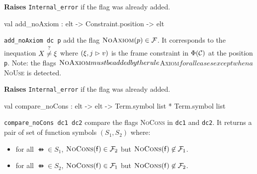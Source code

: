 \begin{ocamldocsigend}
\begin{ocamldocdescription}
{\bf Raises} {\tt{Internal\_error}} if the flag was already added. \lowdebug 


\end{ocamldocdescription}


\label{val:Constraint.Deducibility.add-underscorenoAxiom}\begin{ocamldoccode}
val add_noAxiom : elt ->
  Constraint.position -> elt
\end{ocamldoccode}
\begin{ocamldocdescription}
{\tt{add\_noAxiom dc p}} add the flag $\textsc{NoAxiom}(p) \in \mathcal{F}$. 
      It corresponds to the inequation $X \stackrel{?}{\neq} \xi$ where $(\xi, j \vartriangleright v)$ is the 
      frame constraint in $\Phi(\mathcal{C})$ at the position  {\tt{p}}.
      Note: the flags $\textsc{NoAxiom}  must be added by the rule $\textsc{Axiom}$  for all 
      cases except when a $\textsc{NoUse}  is detected.

{\bf Raises} {\tt{Internal\_error}} if the flag was already added. \lowdebug 


\end{ocamldocdescription}


\label{val:Constraint.Deducibility.compare-underscorenoCons}\begin{ocamldoccode}
val compare_noCons : elt ->
  elt -> Term.symbol list * Term.symbol list
\end{ocamldoccode}
\begin{ocamldocdescription}
{\tt{compare\_noCons dc1 dc2}} compare the flags \textsc{NoCons}  in {\tt{dc1}} and {\tt{dc2}}. 
      It returns a pair of set of function symbols $(S_1,S_2)$  where:
      \begin{itemize}
\item for all $\ffun \in S_1$, $\textsc{NoCons}(\mathsf{f}) \in \mathcal{F}_2$ but $\textsc{NoCons}(\mathsf{f}) \not\in \mathcal{F}_1$.  
\item for all $\ffun \in S_2$, $\textsc{NoCons}(\mathsf{f}) \in \mathcal{F}_1$ but $\textsc{NoCons}(\mathsf{f}) \not\in \mathcal{F}_2$. 
\end{itemize}



\end{ocamldocdescription}



\end{ocamldocsigend}
